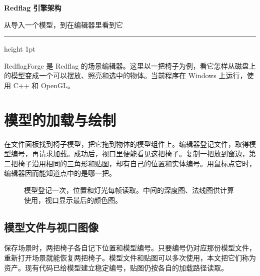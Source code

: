 \documentclass[UTF8,fontset=fandol,10pt,a4paper]{ctexart}
\newcommand{\ruleline}{\par\vspace{-4pt}{\color{line}\hrule}\vspace{8pt}}
\begin{document}
\raggedright
{\Huge\bfseries Redflag 引擎架构}\par\vspace{5pt}
{\large\color{muted}从导入一个模型，到在编辑器里看到它}\par
{\color{blue}\hrule height 1pt}\vspace{10pt}
RedflagForge 是 Redflag 的场景编辑器。这里以一把椅子为例，看它怎样从磁盘上的模型变成一个可以摆放、照亮和选中的物体。当前程序在 Windows 上运行，使用 C++ 和 OpenGL。

\section{模型的加载与绘制}\ruleline
在文件面板找到椅子模型，把它拖到物体的模型组件上。编辑器登记文件，取得模型编号，再请求加载。成功后，视口里便能看见这把椅子。复制一把放到窗边，第二把椅子沿用相同的三角形和贴图，却有自己的位置和实体编号。用鼠标点它时，编辑器因而能知道点中的是哪一把。

\begin{figure}[H]\centering
{}\caption{模型登记一次，位置和灯光每帧读取。中间的深度图、法线图供计算使用，视口显示最后的颜色图。}\end{figure}

\subsection{模型文件与视口图像}
保存场景时，两把椅子各自记下位置和模型编号。只要编号仍对应那份模型文件，重新打开场景就能恢复两把椅子。模型文件和贴图可以多次使用，本文把它们称为资产。现有代码已给模型建立稳定编号，贴图仍按各自的加载路径读取。
\end{document}
